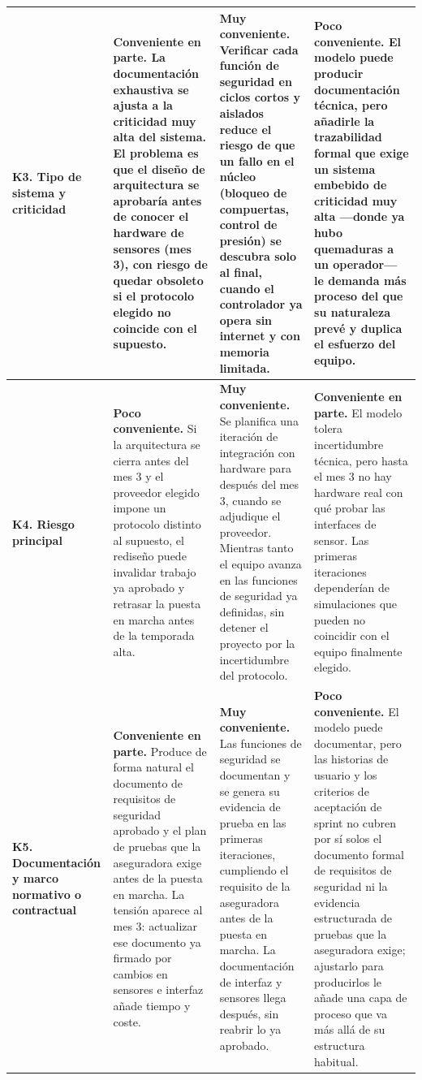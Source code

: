 \documentclass[12pt,a4paper]{article}
\begin{document}
\begin{longtable}{>{\raggedright\arraybackslash}p{2.0cm} >{\raggedright\arraybackslash}p{4.0cm} >{\raggedright\arraybackslash}p{4.0cm} >{\raggedright\arraybackslash}p{4.0cm}}
\textbf{K3. Tipo de sistema y criticidad} & \textbf{Conveniente en parte.} La documentación exhaustiva se ajusta a la criticidad muy alta del sistema. El problema es que el diseño de arquitectura se aprobaría antes de conocer el hardware de sensores (mes 3), con riesgo de quedar obsoleto si el protocolo elegido no coincide con el supuesto. & \textbf{Muy conveniente.} Verificar cada función de seguridad en ciclos cortos y aislados reduce el riesgo de que un fallo en el núcleo (bloqueo de compuertas, control de presión) se descubra solo al final, cuando el controlador ya opera sin internet y con memoria limitada. & \textbf{Poco conveniente.} El modelo puede producir documentación técnica, pero añadirle la trazabilidad formal que exige un sistema embebido de criticidad muy alta —donde ya hubo quemaduras a un operador— le demanda más proceso del que su naturaleza prevé y duplica el esfuerzo del equipo. \\ \midrule
\textbf{K4. Riesgo principal} & \textbf{Poco conveniente.} Si la arquitectura se cierra antes del mes 3 y el proveedor elegido impone un protocolo distinto al supuesto, el rediseño puede invalidar trabajo ya aprobado y retrasar la puesta en marcha antes de la temporada alta. & \textbf{Muy conveniente.} Se planifica una iteración de integración con hardware para después del mes 3, cuando se adjudique el proveedor. Mientras tanto el equipo avanza en las funciones de seguridad ya definidas, sin detener el proyecto por la incertidumbre del protocolo. & \textbf{Conveniente en parte.} El modelo tolera incertidumbre técnica, pero hasta el mes 3 no hay hardware real con qué probar las interfaces de sensor. Las primeras iteraciones dependerían de simulaciones que pueden no coincidir con el equipo finalmente elegido. \\ \midrule
\textbf{K5. Documentación y marco normativo o contractual} & \textbf{Conveniente en parte.} Produce de forma natural el documento de requisitos de seguridad aprobado y el plan de pruebas que la aseguradora exige antes de la puesta en marcha. La tensión aparece al mes 3: actualizar ese documento ya firmado por cambios en sensores e interfaz añade tiempo y coste. & \textbf{Muy conveniente.} Las funciones de seguridad se documentan y se genera su evidencia de prueba en las primeras iteraciones, cumpliendo el requisito de la aseguradora antes de la puesta en marcha. La documentación de interfaz y sensores llega después, sin reabrir lo ya aprobado. & \textbf{Poco conveniente.} El modelo puede documentar, pero las historias de usuario y los criterios de aceptación de sprint no cubren por sí solos el documento formal de requisitos de seguridad ni la evidencia estructurada de pruebas que la aseguradora exige; ajustarlo para producirlos le añade una capa de proceso que va más allá de su estructura habitual. \\ \midrule
\bottomrule
\end{longtable}
\endgroup
\end{document}

